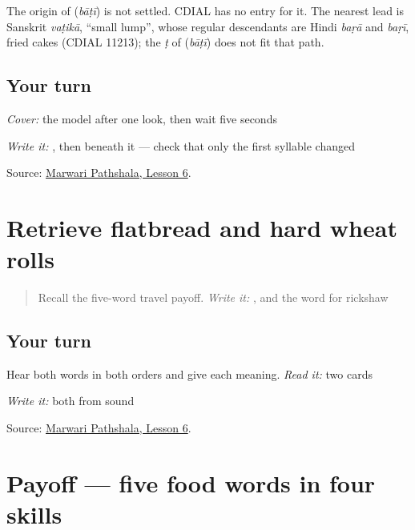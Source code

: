 \begin{cousinweb}
The origin of \textbf{} (\emph{bāṭī}) is not settled. CDIAL has no entry for it. The nearest lead is Sanskrit \emph{vaṭikā}, \textquotedblleft{}small lump\textquotedblright{}, whose regular descendants are Hindi \emph{baṛā} and \emph{baṛī}, fried cakes (CDIAL 11213); the \emph{ṭ} of \textbf{} (\emph{bāṭī}) does not fit that path.
\end{cousinweb}

\subsection*{Your turn}
\emph{Cover:} the model after one look, then wait five seconds

\emph{Write it:} \textbf{}, then \textbf{} beneath it — check that only the first syllable changed

\begin{tcolorbox}[breakable,colback=teal!4,colframe=teal!35!black,title={Before you move on}]
Source: \href{https://www.marwaripathshala.com/marwari-lesson-6-english}{Marwari Pathshala, Lesson 6}.
\end{tcolorbox}
\section[Practice]{Retrieve flatbread and hard wheat rolls}

\label{lesson:MW-R19-food-new-two}



\begin{quote}
Recall the five-word travel payoff. \emph{Write it:} \textbf{}, and the word for rickshaw
\end{quote}

\subsection*{Your turn}
Hear both words in both orders and give each meaning. \emph{Read it:} two cards

\emph{Write it:} both from sound

\begin{tcolorbox}[breakable,colback=teal!4,colframe=teal!35!black,title={Before you move on}]
Source: \href{https://www.marwaripathshala.com/marwari-lesson-6-english}{Marwari Pathshala, Lesson 6}.
\end{tcolorbox}
\section[Practice]{Payoff — five food words in four skills}

